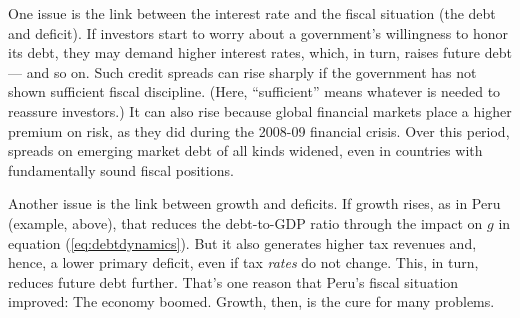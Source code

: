 One issue is the link between the interest rate
and the fiscal situation (the debt and deficit).
If investors start to worry about a government's
willingness to honor its debt,
they may demand higher interest rates,
which, in turn, raises future debt --- and so on.
Such credit spreads can rise sharply
if the government has not shown sufficient
fiscal discipline. 
%
(Here, ``sufficient'' means whatever is needed to reassure
investors.)
It can also rise because global financial markets
place a higher premium on risk,
as they did during the 2008-09 financial crisis.
Over this period, spreads on emerging market debt of all kinds
widened, even in countries with fundamentally sound
fiscal positions.

Another issue is the link between growth and deficits.
If growth rises, as in Peru (example, above),
that reduces the debt-to-GDP ratio through
the impact on $g$ in equation (\ref{eq:debtdynamics}).
But it also generates higher tax revenues and, hence,
a lower primary deficit, even if tax {\it rates\/}
do not change.
This, in turn, reduces future debt further.
That's one reason that Peru's fiscal situation improved:
The economy boomed.
Growth, then, is the cure for many problems.


